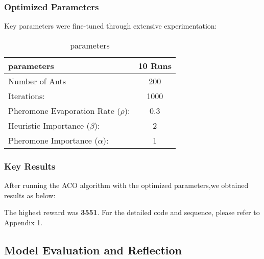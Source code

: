 \documentclass[twocolumn, a4paper]{article}
\begin{document}
\subsubsection{Optimized Parameters}
Key parameters were fine-tuned through extensive experimentation:
\begin{table}[htbp]
  \centering
  \setlength{\tabcolsep}{4pt}
  \caption{parameters}
\begin{tabular}{@{}lc@{}}
    \toprule
    \textbf{parameters}   & \textbf{10 Runs} \\
    \midrule
Number of Ants            &200\\
Iterations:                 &1000\\
Pheromone Evaporation Rate ($\rho$): &0.3\\
Heuristic Importance ($\beta$):    &2\\
Pheromone Importance ($\alpha$): &1 \\
    \bottomrule
  \end{tabular}
  \label{tab:reliability}
\end{table}

\subsubsection{Key Results}
After running the ACO algorithm with the optimized parameters,we obtained results as below:

The highest reward was \textbf{3551}. For the detailed code and sequence, please refer to Appendix 1.

\subsection{Model Evaluation and Reflection}
\end{document}
